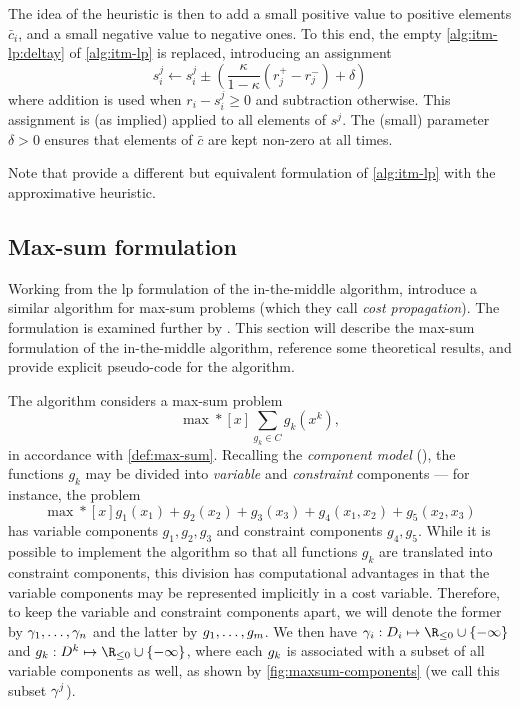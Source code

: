 The idea of the heuristic is then to add a small positive value to positive elements \(\bar{c}_i\), and a small negative value to negative ones.
To this end, the empty \cref{alg:itm-lp:deltay} of \cref{alg:itm-lp} is replaced, introducing an assignment
\begin{equation*}
	s^j_i \leftarrow s^j_i \pm \left(\frac{\kappa}{1-\kappa}(r^+_j - r^-_j) + \delta\right)
\end{equation*}
where addition is used when \(r_i - s^j_i \geq 0\) and subtraction otherwise.
This assignment is (as implied) applied to all elements of \(s^j\).
The (small) parameter \(\delta>0\) ensures that elements of \(\bar{c}\) are kept non-zero at all times.

Note that \textcite[\pno~97]{Bastert10} provide a different but equivalent formulation of \cref{alg:itm-lp} with the approximative heuristic.

\subsection{Max-sum formulation}
Working from the \gls{lp} formulation of the in-the-middle algorithm, \textcite{Wedelin08} introduce a similar algorithm for max-sum problems (which they call \emph{cost propagation}).
The formulation is examined further by \textcite[\pno~11\psqq]{Wedelin13}.
This section will describe the max-sum formulation of the in-the-middle algorithm, reference some theoretical results, and provide explicit pseudo-code for the algorithm.

The algorithm considers a max-sum problem
\begin{equation}\label{eq:maxsum}
	\max*[x] \sum_{g_k\in C} g_k(x^k),
\end{equation}
in accordance with \cref{def:max-sum}.
Recalling the \emph{component model} (), the functions \(g_k\) may be divided into \emph{variable} and \emph{constraint} components --- for instance, the problem
\begin{equation*}
	\max*[x] g_1(x_1) + g_2(x_2) + g_3(x_3) + g_4(x_1, x_2) + g_5(x_2, x_3)
\end{equation*}
has variable components \(g_1, g_2, g_3\) and constraint components \(g_4, g_5\).
While it is possible to implement the algorithm so that all functions \(g_k\) are translated into constraint components, this division has computational advantages in that the variable components may be represented implicitly in a cost variable.
Therefore, to keep the variable and constraint components apart, we will denote the former by \(\gamma_1,\dotsc,\gamma_n\) and the latter by \(g_1,\dotsc,g_m\).
We then have \(\vcomp_i : D_i \mapsto \Rminus \cup \{-\infty\}\) and \(\ccomp_k : D^k \mapsto \Rminus \cup \{-\infty\}\), where each \(g_k\) is associated with a subset of all variable components as well, as shown by \cref{fig:maxsum-components} (we call this subset \(\gamma^j\)).


